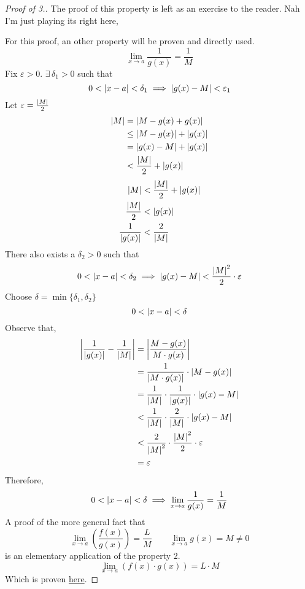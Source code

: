 \documentclass[12pt]{report}
\begin{document}
    \begin{proof}[Proof of \textnormal{3}.]
        The proof of this property is left as an exercise to the reader. Nah I'm just playing its right here,

        For this proof, an other property will be proven and directly used.
        \[\lim_{x \to a} \frac{1}{g(x)} = \frac{1}{M}\]
        Fix \(\varepsilon > 0\). \(\exists \, \delta_1 > 0\) such that
        \[0 < \left| x-a \right| < \delta_1 \implies \left| g(x) - M \right| < \varepsilon_1\]
        Let \(\varepsilon = \frac{\left| M \right|}{2}\)
        \begin{align*}
            \left| M \right| &= \left| M -g(x) + g(x) \right|\\
            &\leq \left| M -g(x) \right| + \left| g(x) \right|\\
            &= \left| g(x) - M \right| + \left| g(x) \right|\\
            &< \frac{\left| M \right|}{2} + \left| g(x) \right|
        \end{align*}
        \begin{align*}
            \left| M \right| &< \frac{\left| M \right|}{2} + \left| g(x) \right|\\
            \frac{\left| M \right|}{2} &< \left| g(x) \right|\\
            \frac{1}{\left| g(x) \right|} &< \frac{2}{\left| M \right|} 
        \end{align*}
        There also exists a \(\delta_2>0\) such that
        \[0< \left| x-a \right|< \delta_2 \implies \left| g(x) - M \right| < \frac{\left| M \right|^2}{2} \cdot \varepsilon\]
        Choose \(\delta = \min \{\delta_1, \delta_2\}\)
        \[0 < \left| x-a \right| < \delta\]
        Observe that,
        \begin{align*}
            \left| \frac{1}{\left| g(x) \right|} - \frac{1}{\left| M \right|} \right| &=  \left| \frac{M - g(x)}{M \cdot g(x)} \right|\\
            &= \frac{1}{\left| M \cdot g(x) \right|} \cdot \left| M - g(x) \right|\\
            &= \frac{1}{\left| M \right|} \cdot \frac{1}{\left| g(x) \right|} \cdot \left| g(x) - M \right|\\
            &< \frac{1}{\left| M \right|} \cdot \frac{2}{\left| M \right|} \cdot \left| g(x) - M \right|\\
            &< \frac{2}{\left| M \right|^2} \cdot \frac{\left| M \right|^2}{2} \cdot \varepsilon\\
            &= \varepsilon
        \end{align*}
        Therefore,
        \[0 < \left| x-a \right| < \delta \implies \lim_{x \to a} \frac{1}{g(x)} = \frac{1}{M}\]
        A proof of the more general fact that
        \[\lim _{x \to a} \left(\frac{f(x)}{g(x)}\right) = \frac{L}{M} \qquad \lim _{x \to a} g(x) = M \not = 0\]
        is an elementary application of the property 2.
        \[\lim _{x \to a} \left(f(x) \cdot g(x)\right) = L \cdot M\]
        Which is proven \hyperref[Properties of limits multiplication]{here}.
    \end{proof}
\end{document}
